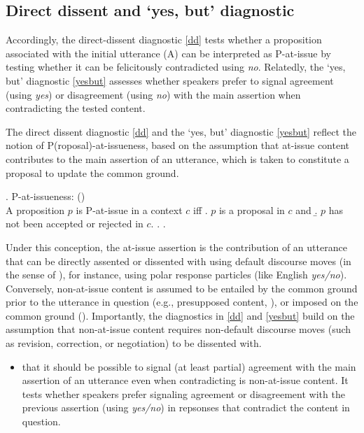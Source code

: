   \subsection{Direct dissent and `yes, but' diagnostic}
    Accordingly, the direct-dissent diagnostic \ref{dd} tests whether a proposition associated with the initial utterance (A) can be interpreted as P-at-issue by testing whether it can be felicitously contradicted using \emph{no}. Relatedly, the `yes, but' diagnostic \ref{yesbut} assesses whether speakers prefer to signal agreement (using \emph{yes}) or disagreement (using \emph{no}) with the main assertion when contradicting the tested content.

    The direct dissent diagnostic \ref{dd} and the `yes, but' diagnostic \ref{yesbut} reflect the notion of P(roposal)-at-issueness, based on the assumption that at-issue content contributes to the main assertion of an utterance, which is taken to constitute a proposal to update the common ground.

     \ex. P-at-issueness: \hfill (\citealt{koev_apposition_2013,koev_notions_2018})\\
      A proposition $p$ is P-at-issue in a context $c$ iff
      \a. $p$ is a proposal in $c$ and
      \b. $p$ has not been accepted or rejected in $c$.
      \z.
    \z.

    Under this conception, the at-issue assertion is the contribution of an utterance that can be directly assented or dissented with using default discourse moves (in the sense of \citealt{farkas_reacting_2010}), for instance, using polar response particles (like English \emph{yes/no}). Conversely, non-at-issue content is assumed to be entailed by the common ground prior to the utterance in question (e.g., presupposed content, \citealt{stalnaker_presuppositions_1973,stalnaker_common_2002}), or imposed on the common ground (\citealt{murray_varieties_2014,anderbois_at-issue_2015}). Importantly, the diagnostics in \ref{dd} and \ref{yesbut} build on the assumption that non-at-issue content requires non-default discourse moves (such as revision, correction, or negotiation) to be dissented with.

    \begin{itemize}
      \item that it should be possible to signal (at least partial) agreement with the main assertion of an utterance even when contradicting is non-at-issue content. It tests whether speakers prefer signaling agreement or disagreement with the previous assertion (using \emph{yes/no}) in repsonses that contradict the content in question.

    \end{itemize}


